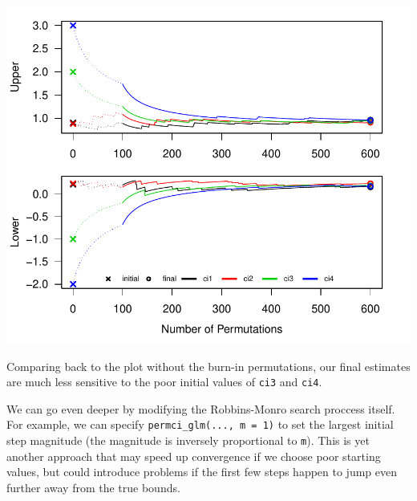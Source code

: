 \documentclass[12pt]{article}\usepackage[]{graphicx}\usepackage[]{color}
\makeatletter
\def\maxwidth{ %
  \ifdim\Gin@nat@width>\linewidth
    \linewidth
  \else
    \Gin@nat@width
  \fi
}
\newenvironment{knitrout}{}{} %
\makeatother
\begin{document}
\begin{knitrout}
\color{fgcolor}

{\centering \includegraphics[width=\maxwidth]{figure/ci_plots2-1} 

}



\end{knitrout}
Comparing back to the plot without the burn-in permutations, our final estimates are much less sensitive to the poor initial values of \texttt{ci3} and \texttt{ci4}.

We can go even deeper by modifying the Robbins-Monro search proccess itself. For example, we can specify \texttt{permci\_glm(..., m = 1)} to set the largest initial step magnitude (the magnitude is inversely proportional to \texttt{m}). This is yet another approach that may speed up convergence if we choose poor starting values, but could introduce problems if the first few steps happen to jump even further away from the true bounds.
\end{document}
